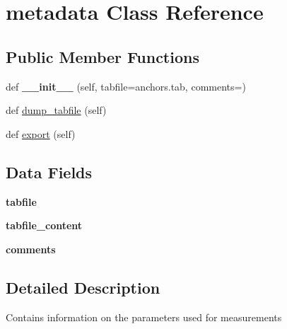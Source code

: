 \hypertarget{classjson_structures_1_1metadata}{}\section{metadata Class Reference}
\label{classjson_structures_1_1metadata}
\subsection*{Public Member Functions}
\begin{DoxyCompactItemize}
\item 
\mbox{\label{classjson_structures_1_1metadata_a24cd6e55b96cd55c72425ed932cb6d29}} 
def {\bfseries \+\_\+\+\_\+init\+\_\+\+\_\+} (self, tabfile=\textquotesingle{}anchors.\+tab\textquotesingle{}, comments=\textquotesingle{}\textquotesingle{})
\item 
def \mbox{\hyperlink{classjson_structures_1_1metadata_ad58622cada13d50f915c4e27ca4c711e}{dump\+\_\+tabfile}} (self)
\item 
def \mbox{\hyperlink{classjson_structures_1_1metadata_a68cc2498d25cf6670863c141957ac262}{export}} (self)
\end{DoxyCompactItemize}
\subsection*{Data Fields}
\begin{DoxyCompactItemize}
\item 
\mbox{\label{classjson_structures_1_1metadata_a00f9a31137e6954973ab5676cf14f447}} 
{\bfseries tabfile}
\item 
\mbox{\label{classjson_structures_1_1metadata_a5a5e3e8b4bd0d8acb4188aa82bce8786}} 
{\bfseries tabfile\+\_\+content}
\item 
\mbox{\label{classjson_structures_1_1metadata_a64b8b36116751d566275b722e40bb3a7}} 
{\bfseries comments}
\end{DoxyCompactItemize}


\subsection{Detailed Description}
\begin{DoxyVerb}Contains information on the parameters used for measurements\end{DoxyVerb}
 

